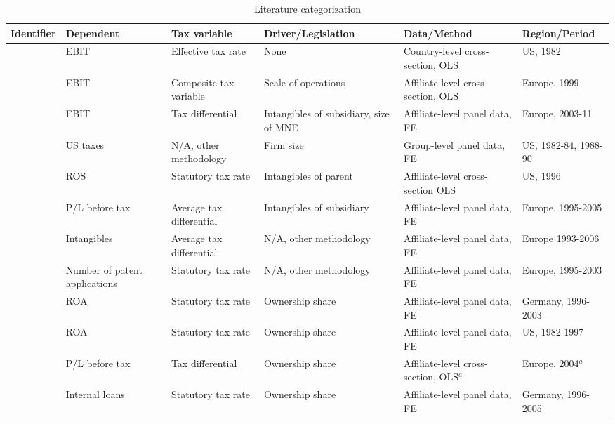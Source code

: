\documentclass[10pt,twocolumn,oneside,cmyk]{article}
\begin{document}
\begin{sidewaystable}
 \footnotesize
 \begin{center}
  \captionsetup{width=\textwidth}
  \caption{Literature categorization}\label{tab15}
   \begin{tabularx}{\textwidth}{l l l l l l}
   \toprule
   Identifier &Dependent &Tax variable &Driver/Legislation & Data/Method &Region/Period\\
   \midrule
   \textcite{hines_fiscal_1994} &EBIT &Effective tax rate &None &Country-level cross-section, OLS &US, 1982\\
   \textcite{huizinga_international_2008} &EBIT &Composite tax variable &Scale of operations &Affiliate-level cross-section, OLS &Europe, 1999\\
   \textcite{beer_profit_2015} &EBIT &Tax differential &Intangibles of subsidiary, size of MNE &Affiliate-level panel data, FE &Europe, 2003-11\\
   \textcite{conover_further_2000} &US taxes &N/A, other methodology &Firm size &Group-level panel data, FE &US, 1982-84, 1988-90\\
   \textcite{grubert_intangible_2003} &ROS &Statutory tax rate &Intangibles of parent &Affiliate-level cross-section OLS &US, 1996\\
   \textcite{dischinger_corporate_2011} &P/L before tax &Average tax differential &Intangibles of subsidiary &Affiliate-level panel data, FE &Europe, 1995-2005\\
   \textcite{dischinger_corporate_2008} &Intangibles &Average tax differential &N/A, other methodology &Affiliate-level panel data, FE &Europe 1993-2006\\
   \textcite{karkinsky_corporate_2012} &Number of patent applications &Statutory tax rate &N/A, other methodology &Affiliate-level panel data, FE &Europe, 1995-2003\\
   \textcite{weichenrieder_profit_2009} &ROA &Statutory tax rate &Ownership share &Affiliate-level panel data, FE &Germany, 1996-2003\\
   \textcite{desai_costs_2004} &ROA &Statutory tax rate &Ownership share &Affiliate-level panel data, FE &US, 1982-1997\\
   \textcite{dischinger_profit_2008} &P/L before tax &Tax differential &Ownership share &Affiliate-level cross-section, OLS$^a$ &Europe, 2004$^a$\\
   \textcite{buettner_internal_2013} &Internal loans &Statutory tax rate &Ownership share &Affiliate-level panel data, FE &Germany, 1996-2005\\

\end{tabularx}
\end{center}
\end{sidewaystable}
\end{document}

